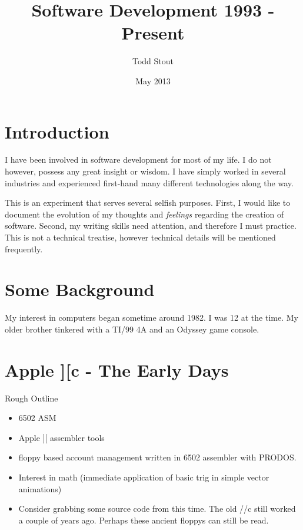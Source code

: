 \documentclass[12pt]{report}
\title{Software Development 1993 - Present}
\author{Todd Stout}
\date{May 2013}
\begin{document}
\maketitle

\section{Introduction}
I have been involved in software development for most of my life. I do
not however, possess any great insight or wisdom. I have simply worked
in several industries and experienced first-hand many different
technologies along the way.

This is an experiment that serves several selfish purposes. First, I
would like to document the evolution of my thoughts and
\emph{feelings} regarding the creation of software. Second, my writing
skills need attention, and therefore I must practice. This is not a technical
treatise, however technical details will be mentioned frequently.

\pagebreak

%
%
\section{Some  Background}
My interest in computers began sometime around 1982. I was 12 at the
time. My older brother tinkered with a TI/99 4A and an Odyssey game console.
		
\section{Apple ][c - The Early Days}
	Rough Outline
	\begin{itemize}
	\item 6502 ASM
	\item Apple ][ assembler tools
	\item floppy based account management written in 6502 assembler with PRODOS.
	\item Interest in math (immediate application of basic trig in simple vector animations)
	\item Consider grabbing some source code from this time. The old //c still worked a couple of years ago. Perhaps these ancient floppys can still be read.
	\end{itemize}
	
\end{document}
